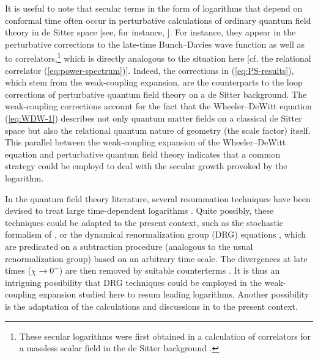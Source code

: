 \documentclass[12pt]{iopart}
\def\eref#1{(\ref{eq:#1})}
\begin{document}
It is useful to note that secular terms in the form of logarithms that depend on conformal time often occur in perturbative calculations of ordinary quantum field theory in de Sitter space [see, for instance, \citet{STAROBINSKY1982175,LINDE1982335,Vilenkin:1982wt,Ford:1985qh,Allen:1987tz,Weinberg:2005vy,Weinberg:2006ac,Burgess:2009bs,Seery:2010kh}]. For instance, they appear in the perturbative corrections to the late-time Bunch--Davies wave function \citep{Anninos:2014lwa} as well as to correlators,\footnote{These secular logarithms were first obtained in a calculation of correlators for a massless scalar field in the de Sitter background \citep{STAROBINSKY1982175}.} which is directly analogous to the situation here [cf. the relational correlator \eref{power-spectrum}]. Indeed,  the corrections in \eref{PS-results}, which stem from the weak-coupling expansion, are the counterparts to the loop corrections \citep{Barvinsky:1997hp} of perturbative quantum field theory on a de Sitter background. The weak-coupling corrections account for the fact that the Wheeler--DeWitt equation \eref{WDW-1} describes not only quantum matter fields on a classical de Sitter space but also the relational quantum nature of geometry (the scale factor) itself. This parallel between the weak-coupling expansion of the Wheeler--DeWitt equation and perturbative quantum field theory indicates that a common strategy could be employd to deal with the secular growth provoked by the logarithm.

In the quantum field theory literature, several resummation techniques have been devised to treat large time-dependent logarithms \citep{Starobinsky:1986fx,Starobinsky:1994bd,Chen:1995ena,Collins:2017haz,Green:2020txs,Cohen:2020php,Kamenshchik:2020yyn}. Quite possibly, these techniques could be adapted to the present context, such as the stochastic formalism of \citet{Starobinsky:1986fx,Starobinsky:1994bd}, or the dynamical renormalization group (DRG) equations \citep{Chen:1995ena,Burgess:2009bs,Seery:2010kh,Green:2020txs,Cohen:2020php}, which are predicated on a subtraction procedure (analogous to the usual renormalization group) based on an arbitrary time scale. The divergences at late times ($\chi\to0^-$) are then removed by suitable counterterms \citep{Chen:1995ena}. It is thus an intriguing possibility that DRG techniques could be employed in the weak-coupling expansion studied here to resum leading logarithms. Another possibility is the adaptation of the calculations and discussions in \citet{Glavan:2021adm,Miao:2021gic,Woodard:2023rqo,Woodard:2023vcw} to the present context.
\end{document}
